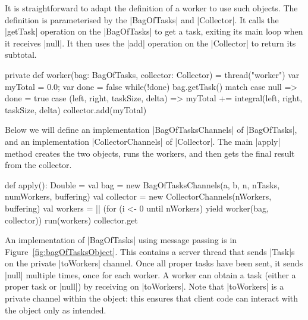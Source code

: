 
It is straightforward to adapt the definition of a worker to use such objects.
The definition is parameterised by the |BagOfTasks| and |Collector|.  It calls
the |getTask| operation on the |BagOfTasks| to get a task, exiting its main
loop when it receives |null|.  It then uses the |add| operation on the
|Collector| to return its subtotal.
%
\begin{mysamepage}
\begin{scala}
  private def worker(bag: BagOfTasks, collector: Collector) = thread("worker"){
    var myTotal = 0.0; var done = false
    while(!done) bag.getTask() match{
      case null => done = true
      case (left, right, taskSize, delta) =>
        myTotal += integral(left, right, taskSize, delta)
    }
    collector.add(myTotal)
  }
\end{scala}
\end{mysamepage}

Below we will define an implementation |BagOfTasksChannels| of |BagOfTasks|,
and an implementation |CollectorChannels| of |Collector|.  The main |apply|
method creates the two objects, runs the workers, and then gets the
final result from the collector.
\begin{scala}
  def apply(): Double = {
    val bag = new BagOfTasksChannels(a, b, n, nTasks, numWorkers, buffering)
    val collector = new CollectorChannels(nWorkers, buffering)
    val workers = || (for (i <- 0 until nWorkers) yield worker(bag, collector))
    run(workers)
    collector.get
  }
\end{scala}


An implementation of |BagOfTasks| using message passing is in
Figure~\ref{fig:bagOfTasksObject}.  This contains a server thread that sends
|Task|s on the private |toWorkers| channel.  Once all proper tasks have been
sent, it sends |null| multiple times, once for each worker.  A worker can
obtain a task (either a proper task or |null|) by receiving on |toWorkers|.
Note that |toWorkers| is a private channel within the object: this ensures
that client code can interact with the object only as intended.


